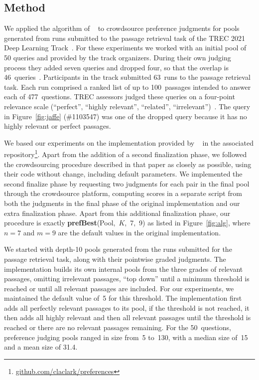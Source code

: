 \subsection{Method}

We applied the algorithm of ~\citet{cvs21} to crowdsource preference judgments for pools generated from runs submitted to the passage retrieval task of the TREC 2021 Deep Learning Track~\cite{DL21}. For these experiments we worked with an initial pool of 50 queries and provided by the track organizers. During their own judging process they added seven queries and dropped four, so that the overlap is 46~queries~\cite{TREC21}.  Participants in the track submitted 63~runs to the passage retrieval task. Each run comprised a ranked list of up to 100~passages intended to answer each of 477~questions. TREC assessors judged  these queries on a four-point relevance scale (``perfect'', ``highly relevant'', ``related'', ``irrelevant'')~\cite{TREC21}. The query in Figure~\ref{fig:jaffe} (\#1103547) was one of the dropped query because it has no highly relevant or perfect passages.

We based our experiments on the implementation provided by ~\citet{cvs21} in the associated repository\footnote{\url{github.com/claclark/preferences}}. Apart from the addition of a second finalization phase, we followed the crowdsourcing procedure described in that paper as closely as possible, using their code without change, including default parameters. We implemented the second finalize phase by requesting two judgments for each pair in the final pool through the crowdsource platform, computing scores in a separate script from both the judgments in the final phase of the original implementation and our extra finalization phase. Apart from this additional finalization phase, our procedure is exactly \mbox{{\bf prefBest}(Pool, $K$, 7, 9)} as listed in Figure~\ref{fig:alg}, where $n = 7$ and $m = 9$ are the default values in the original implementation.

We started with depth-10 pools generated from the runs submitted for the passage retrieval task, along with their pointwise graded judgments. The implementation builds its own internal pools from the three grades of relevant passages, omitting irrelevant passages, ``top down'' until a minimum threshold is reached or until all relevant passages are included. For our experiments, we maintained the default value of~5 for this threshold. The implementation first adds all perfectly relevant passages to its pool, if the threshold is not reached, it then adds all highly relevant and then all relevant passages until the threshold is reached or there are no relevant passages remaining. For the 50~questions, preference judging pools ranged in size from~5 to~130, with a median size of~15 and a mean size of 31.4.

